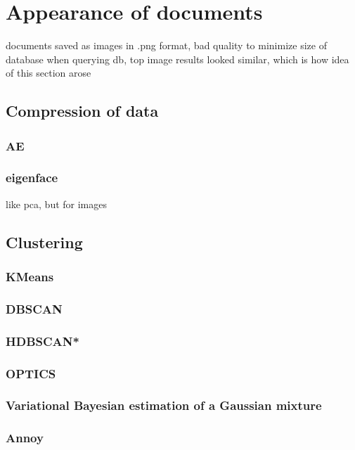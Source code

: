 \section{Appearance of documents}\label{sec:appearance}
documents saved as images in .png format, bad quality to minimize size of database
when querying db, top image results looked similar, which is how idea of this section arose

\subsection{Compression of data}\label{subsec:compression}
\subsubsection{AE}\label{subsec:autoencoder}

\subsubsection{eigenface}\label{subsec:eigenface}
like pca, but for images

\subsection{Clustering}\label{subsec:clustering}
\subsubsection{KMeans}\label{subsec:kmeans}

\subsubsection{DBSCAN}\label{subsec:dbscan}


\subsubsection{HDBSCAN*}\label{subsec:hdbcan}


\subsubsection{OPTICS}\label{subsec:optics}


\subsubsection{Variational Bayesian estimation of a Gaussian mixture}\label{subsec:varbayes}

\subsubsection{Annoy}\label{subsec:annoy}


